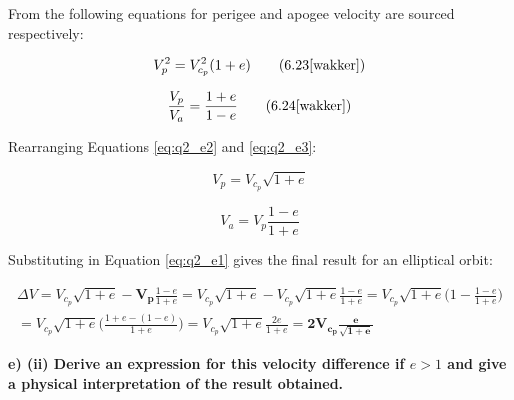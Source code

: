 \noindent From \cite{wakker} the following equations for perigee and apogee velocity are sourced respectively:

\begin{equation}
    V_{p}^2 = V_{c_{p}}^2 (1 + e)
    \tag{6.23\cite{wakker}}
    \label{eq:q2_e2}
\end{equation}

\begin{equation}
    \frac{V_{p}}{V_{a}} = \frac{1 + e}{1 - e}
    \tag{6.24\cite{wakker}}
    \label{eq:q2_e3}
\end{equation}

\noindent Rearranging Equations \ref{eq:q2_e2} and \ref{eq:q2_e3}:

\begin{equation}
    V_{p} = V_{c_{p}} \sqrt{1 + e}
    \label{eq:q2_e4}
\end{equation}

\begin{equation}
    V_{a} = V_{p} \frac{1 - e}{1 + e}
    \label{eq:q2_e5}
\end{equation}

\noindent Substituting in Equation \ref{eq:q2_e1} gives the final result for an elliptical orbit:

\begin{multline}
    \Delta V = V_{c_{p}} \sqrt{1 + e} - \boldsymbol{V_{p}} \frac{1 - e}{1 + e} 
    = V_{c_{p}} \sqrt{1 + e} - V_{c_{p}} \sqrt{1 + e} \frac{1 - e}{1 + e} 
    = V_{c_{p}} \sqrt{1 +e} \Bigg( 1 - \frac{1 - e}{1 + e} \Bigg) \\
    = V_{c_{p}} \sqrt{1 +e} \Bigg( \frac{1 + e - (1 - e)}{1 + e} \Bigg)
    = V_{c_{p}} \sqrt{1 +e} \frac{2e}{1 + e}
    = \boldsymbol{2V_{c_{p}} \frac{e}{\sqrt{1 + e}}}
    \label{eq:q2_e6}
\end{multline}

\noindent \textbf{e) (ii) Derive an expression for this velocity difference if $e > 1$ and give a physical interpretation of the result obtained.}

\bigskip


